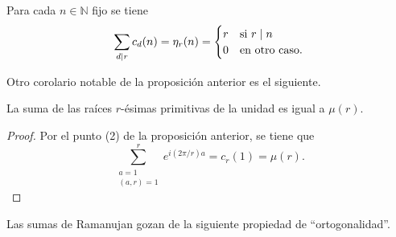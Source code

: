 \begin{corollary}\label{cor:ram5}
Para cada $n \in \mathbb{N}$ fijo se tiene
\begin{equation*}
    \sum_{d \mid r} c_d(n) = \eta_r(n) = \begin{cases}
        \hfil r & \text{si } r \mid n \\
        \hfil 0 & \text{en otro caso}.
    \end{cases}
\end{equation*}
\end{corollary}

Otro corolario notable de la proposición anterior es el siguiente.

\begin{corollary}
La suma de las raíces $r$-ésimas primitivas de la unidad es igual a $\mu(r)$.
\end{corollary}

\begin{proof}
Por el punto (2) de la proposición anterior, se tiene que
\begin{equation*}
    \sum_{\substack{a=1 \\ (a,r)=1}}^{r} e^{i(2 \pi / r) a} = c_r(1)  = \mu(r).
\end{equation*}
\end{proof}

Las sumas de Ramanujan gozan de la siguiente propiedad de ``ortogonalidad''.

